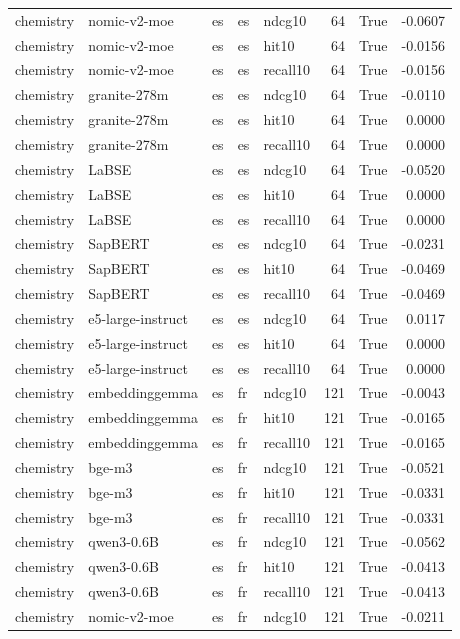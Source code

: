 \begin{tabular}{lllllrrr}
chemistry & nomic-v2-moe & es & es & ndcg10 & 64 & True & -0.0607 \\
chemistry & nomic-v2-moe & es & es & hit10 & 64 & True & -0.0156 \\
chemistry & nomic-v2-moe & es & es & recall10 & 64 & True & -0.0156 \\
chemistry & granite-278m & es & es & ndcg10 & 64 & True & -0.0110 \\
chemistry & granite-278m & es & es & hit10 & 64 & True & 0.0000 \\
chemistry & granite-278m & es & es & recall10 & 64 & True & 0.0000 \\
chemistry & LaBSE & es & es & ndcg10 & 64 & True & -0.0520 \\
chemistry & LaBSE & es & es & hit10 & 64 & True & 0.0000 \\
chemistry & LaBSE & es & es & recall10 & 64 & True & 0.0000 \\
chemistry & SapBERT & es & es & ndcg10 & 64 & True & -0.0231 \\
chemistry & SapBERT & es & es & hit10 & 64 & True & -0.0469 \\
chemistry & SapBERT & es & es & recall10 & 64 & True & -0.0469 \\
chemistry & e5-large-instruct & es & es & ndcg10 & 64 & True & 0.0117 \\
chemistry & e5-large-instruct & es & es & hit10 & 64 & True & 0.0000 \\
chemistry & e5-large-instruct & es & es & recall10 & 64 & True & 0.0000 \\
chemistry & embeddinggemma & es & fr & ndcg10 & 121 & True & -0.0043 \\
chemistry & embeddinggemma & es & fr & hit10 & 121 & True & -0.0165 \\
chemistry & embeddinggemma & es & fr & recall10 & 121 & True & -0.0165 \\
chemistry & bge-m3 & es & fr & ndcg10 & 121 & True & -0.0521 \\
chemistry & bge-m3 & es & fr & hit10 & 121 & True & -0.0331 \\
chemistry & bge-m3 & es & fr & recall10 & 121 & True & -0.0331 \\
chemistry & qwen3-0.6B & es & fr & ndcg10 & 121 & True & -0.0562 \\
chemistry & qwen3-0.6B & es & fr & hit10 & 121 & True & -0.0413 \\
chemistry & qwen3-0.6B & es & fr & recall10 & 121 & True & -0.0413 \\
chemistry & nomic-v2-moe & es & fr & ndcg10 & 121 & True & -0.0211 \\

\end{tabular}

